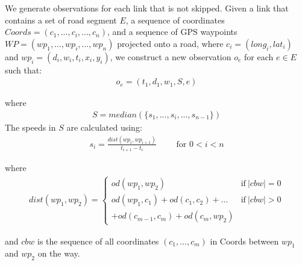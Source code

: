 We generate observations for each link that is not skipped. Given a link that contains a set of road segment $E$, a sequence of coordinates $Coords = (c_1,...,c_i,...,c_n)$, and a sequence of GPS waypoints $WP=(wp_1,...,wp_i,...,wp_n)$ projected onto a road, where $c_i = (long_i, lat_i)$ and $wp_i = (d_i, w_i, t_i, x_i, y_i)$, we construct a new observation $o_e$ for each $e \in E$ such that:
\begin{align*}
o_e = (t_1, d_1, w_1, S, e)
\end{align*}

where
\begin{align*}
S = median(\{s_1,...,s_i,...,s_{n-1}\})
\end{align*}
%
The speeds in $S$ are calculated using:
\begin{align*}
s_i = \frac{dist(wp_i, wp_{i+1})}{t_{i+1} - t_i} \qquad \text{ for } 0 < i < n
\end{align*}

where
\begin{align*}
dist(wp_1, wp_2) = \begin{cases}
od(wp_1, wp_2) & \text{if}\ |cbw| = 0 \\
od(wp_1, c_1) + od(c_1, c_2) + ... & \text{if}\ |cbw| > 0 \\
+ od(c_{m-1}, c_m) + od(c_m, wp_2)
\end{cases}
\end{align*}

and $cbw$ is the sequence of all coordinates $(c_1,...,c_m)$ in Coords between $wp_1$ and $wp_2$ on the way.
